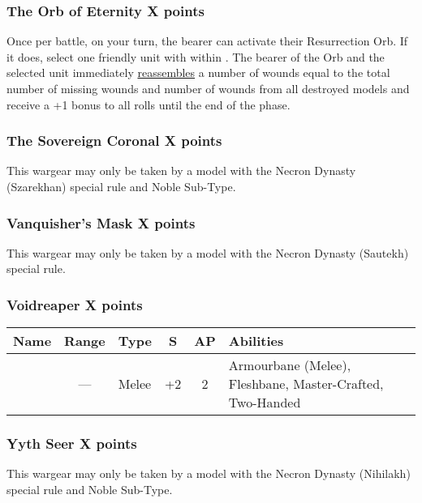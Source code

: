 \subsubsection[The Orb of Eternity]{The Orb of Eternity \dotfill X points}

Once per battle, on your turn, the bearer can activate their Resurrection Orb. If it does, select one friendly unit with  within . The bearer of the Orb and the selected unit immediately \textcolor{violet}{\hyperref[Reanimation Protocols]{reassembles}} a number of wounds equal to the total number of missing wounds and number of wounds from all destroyed models and receive a +1 bonus to all  rolls until the end of the phase.

\subsubsection[The Sovereign Coronal]{The Sovereign Coronal \dotfill X points}
This wargear may only be taken by a model with the Necron Dynasty (Szarekhan) special rule and Noble Sub-Type.

\subsubsection[Vanquisher's Mask]{Vanquisher's Mask \dotfill X points}
This wargear may only be taken by a model with the Necron Dynasty (Sautekh) special rule.

\subsubsection[Voidreaper]{Voidreaper \dotfill X points}

\label{Voidreaper}
\noindent
\begin{NiceTabular}{L{115 pt} c C{40pt} *{2}{c} >{\raggedright\arraybackslash}p{240pt}}
	Name & Range & Type & S & AP & Abilities \\
	\hline
	 & — & Melee & +2 & 2 & Armourbane (Melee), Fleshbane, Master-Crafted, Two-Handed \\
\end{NiceTabular}

\subsubsection[Yyth Seer]{Yyth Seer \dotfill X points} \label{Yyth Seer}
This wargear may only be taken by a model with the Necron Dynasty (Nihilakh) special rule and Noble Sub-Type.


